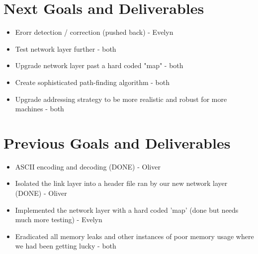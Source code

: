 \documentclass{article}
\begin{document}
\section*{Next Goals and Deliverables}
\begin{itemize}
\item Erorr detection / correction (pushed back) - Evelyn
\item Test network layer further - both
\item Upgrade network layer past a hard coded "map" - both
\item Create sophisticated path-finding algorithm - both
\item Upgrade addressing strategy to be more realistic and robust for more machines - both
\end{itemize}
\section*{Previous Goals and Deliverables}
\begin{itemize}
\item ASCII encoding and decoding (DONE) - Oliver
\item Isolated the link layer into a header file ran by our new network layer (DONE) - Oliver 
\item Implemented the network layer with a hard coded 'map' (done but needs much more testing) - Evelyn
\item Eradicated all memory leaks and other instances of poor memory usage where we had been getting lucky - both 
\end{itemize}
\end{document}
